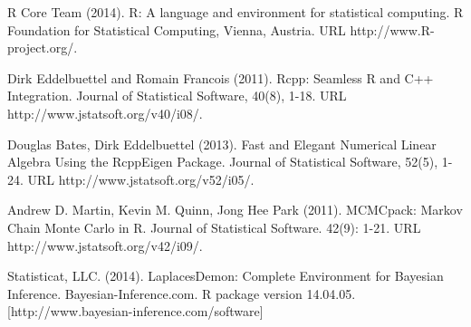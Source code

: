 \documentclass[english]{report}
\begin{document}
\newpage
{}
  
  R Core Team (2014). R: A language and environment for statistical computing. R Foundation for
  Statistical Computing, Vienna, Austria. URL http://www.R-project.org/.
  
  
  Dirk Eddelbuettel and Romain Francois (2011). Rcpp: Seamless R and C++ Integration. Journal of
  Statistical Software, 40(8), 1-18. URL http://www.jstatsoft.org/v40/i08/.


 
 	Douglas Bates, Dirk Eddelbuettel (2013). Fast and Elegant Numerical Linear Algebra Using the
  RcppEigen Package. Journal of Statistical Software, 52(5), 1-24. URL
  http://www.jstatsoft.org/v52/i05/.
  
  Andrew D. Martin, Kevin M. Quinn, Jong Hee Park (2011). MCMCpack: Markov Chain Monte Carlo in R.
  Journal of Statistical Software. 42(9): 1-21. URL http://www.jstatsoft.org/v42/i09/. 

	Statisticat, LLC. (2014). LaplacesDemon: Complete Environment for
  Bayesian Inference. Bayesian-Inference.com. R package version
  14.04.05. [http://www.bayesian-inference.com/software]
\end{document}
